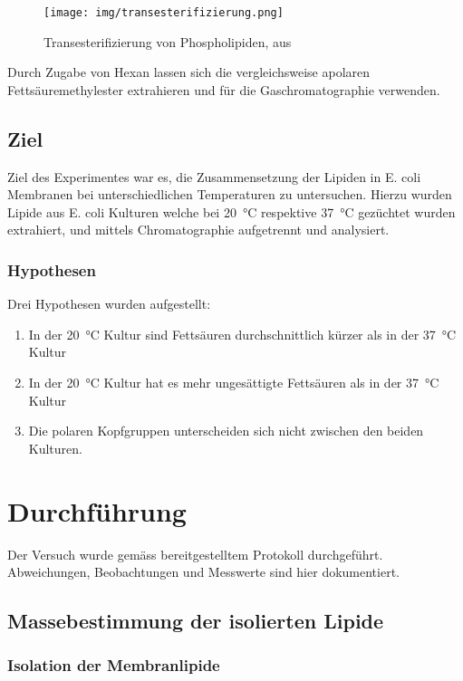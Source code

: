 \documentclass[a4paper,english]{scrreprt}
\begin{document}
\begin{figure}
	\centering
	\texttt{[image: img/transesterifizierung.png]}
	\caption{Transesterifizierung von Phospholipiden, aus \cite{handoutv11}}
	\label{fig:transesterifizierung}
\end{figure}

Durch Zugabe von Hexan lassen sich die vergleichsweise apolaren
Fettsäuremethylester extrahieren und für die Gaschromatographie verwenden.

\section{Ziel}

Ziel des Experimentes war es, die Zusammensetzung der Lipiden in E. coli
Membranen bei unterschiedlichen Temperaturen zu untersuchen. Hierzu wurden
Lipide aus E. coli Kulturen welche bei \SI{20}{\celsius} respektive
\SI{37}{\celsius} gezüchtet wurden extrahiert, und mittels Chromatographie
aufgetrennt und analysiert.

\subsection{Hypothesen}

Drei Hypothesen wurden aufgestellt:
\begin{enumerate}
	\item In der \SI{20}{\celsius} Kultur sind Fettsäuren durchschnittlich
		kürzer als in der \SI{37}{\celsius} Kultur
	\item In der \SI{20}{\celsius} Kultur hat es mehr ungesättigte
		Fettsäuren als in der \SI{37}{\celsius} Kultur
	\item Die polaren Kopfgruppen unterscheiden sich nicht zwischen den
		beiden Kulturen.
\end{enumerate}

\chapter{Durchführung}

Der Versuch wurde gemäss bereitgestelltem Protokoll \cite{skriptv11}
durchgeführt. Abweichungen, Beobachtungen und Messwerte sind hier dokumentiert.

\section{Massebestimmung der isolierten Lipide}

\subsection{Isolation der Membranlipide}
\end{document}
